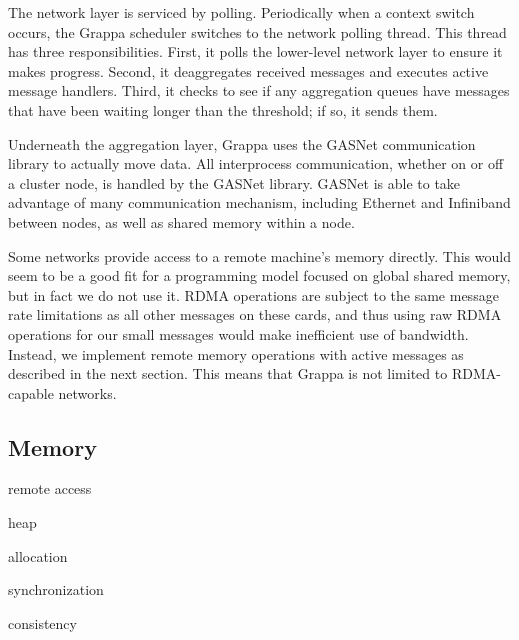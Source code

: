 The network layer is serviced by polling. Periodically when a context
switch occurs, the Grappa scheduler switches to the network polling
thread. This thread has three responsibilities. First, it polls the
lower-level network layer to ensure it makes progress. Second, it
deaggregates received messages and executes active message
handlers. Third, it checks to see if any aggregation queues have
messages that have been waiting longer than the threshold; if so, it
sends them.

Underneath the aggregation layer, Grappa uses the GASNet communication
library  to actually move data. All interprocess
communication, whether on or off a cluster node, is handled by the
GASNet library. GASNet is able to take advantage of many communication
mechanism, including Ethernet and Infiniband between nodes, as well as
shared memory within a node.

Some networks provide access to a remote machine's memory
directly. This would seem to be a good fit for a programming model
focused on global shared memory, but in fact we do not use it. RDMA
operations are subject to the same message rate limitations as all
other messages on these cards, and thus using raw RDMA operations for
our small messages would make inefficient use of bandwidth. Instead,
we implement remote memory operations with active messages as
described in the next section. This means that Grappa is not limited
to RDMA-capable networks.

\subsection{Memory}




remote access

heap

allocation

synchronization

consistency

